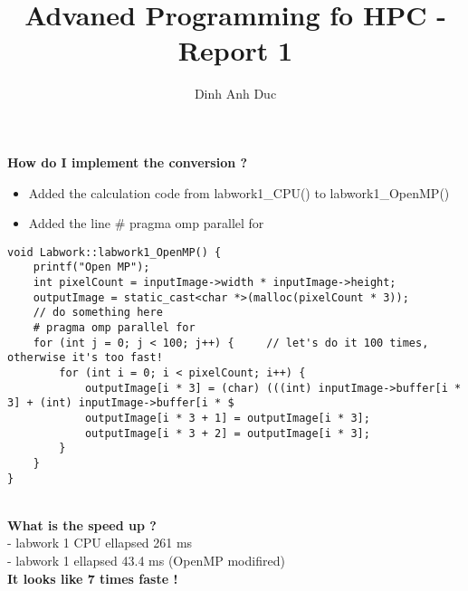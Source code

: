 \documentclass{article}
\title{Advaned Programming fo HPC - Report 1}
\author{Dinh Anh Duc}
\begin{document}
\maketitle

\textbf{How do I implement the conversion ?}
\\
\begin{itemize}
\item Added the calculation code from labwork1_CPU() to labwork1_OpenMP()
\item Added the line # pragma omp parallel for 
\end{itemize}
\begin{lstlisting}
void Labwork::labwork1_OpenMP() {
    printf("Open MP");
    int pixelCount = inputImage->width * inputImage->height;
    outputImage = static_cast<char *>(malloc(pixelCount * 3));
    // do something here
    # pragma omp parallel for
    for (int j = 0; j < 100; j++) {     // let's do it 100 times, otherwise it's too fast!
        for (int i = 0; i < pixelCount; i++) {
            outputImage[i * 3] = (char) (((int) inputImage->buffer[i * 3] + (int) inputImage->buffer[i * $
            outputImage[i * 3 + 1] = outputImage[i * 3];
            outputImage[i * 3 + 2] = outputImage[i * 3];
        }
    }
}
\end{lstlisting}
\\
\textbf{What is the speed up ?}
\\
- labwork 1 CPU ellapsed 261 ms
\\
- labwork 1 ellapsed 43.4 ms (OpenMP modifired)
\\
\textbf{It looks like 7 times faste !} 
\end{document}
